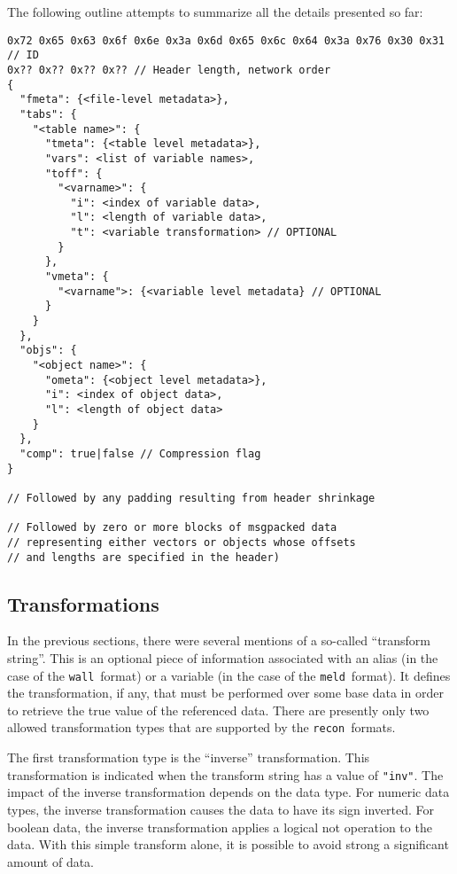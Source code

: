 \documentclass[11pt,a4paper,onecolumn]{article}
\newcommand{\recon}{\texttt{recon}}
\newcommand{\wall}{\texttt{wall}}
\newcommand{\meld}{\texttt{meld}}
\newcommand{\code}[1]{\texttt{#1}} %
\begin{document}
The following outline attempts to summarize all the details presented so
far:

\begin{verbatim}
0x72 0x65 0x63 0x6f 0x6e 0x3a 0x6d 0x65 0x6c 0x64 0x3a 0x76 0x30 0x31   // ID
0x?? 0x?? 0x?? 0x?? // Header length, network order
{
  "fmeta": {<file-level metadata>},
  "tabs": {
    "<table name>": {
      "tmeta": {<table level metadata>},
      "vars": <list of variable names>,
      "toff": {
        "<varname>": {
          "i": <index of variable data>,
          "l": <length of variable data>,
          "t": <variable transformation> // OPTIONAL
        }
      },
      "vmeta": {
        "<varname">: {<variable level metadata} // OPTIONAL
      }
    }
  },
  "objs": {
    "<object name>": {
      "ometa": {<object level metadata>},
      "i": <index of object data>,
      "l": <length of object data>
    }
  },
  "comp": true|false // Compression flag
}

// Followed by any padding resulting from header shrinkage

// Followed by zero or more blocks of msgpacked data
// representing either vectors or objects whose offsets
// and lengths are specified in the header)
\end{verbatim}

\subsection{Transformations}
\label{sec:trans}


In the previous sections, there were several mentions of a so-called
``transform string''.  This is an optional piece of information
associated with an alias (in the case of the \wall\ format) or a
variable (in the case of the \meld\ format).  It defines the
transformation, if any, that must be performed over some base data in
order to retrieve the true value of the referenced data.  There are
presently only two allowed transformation types that are supported by
the \recon\ formats.

The first transformation type is the ``inverse'' transformation.  This
transformation is indicated when the transform string has a value of
\code{"inv"}.  The impact of the inverse transformation depends on the
data type.  For numeric data types, the inverse transformation causes
the data to have its sign inverted.  For boolean data, the inverse
transformation applies a logical not operation to the data.  With this
simple transform alone, it is possible to avoid strong a significant
amount of data.
\end{document}
